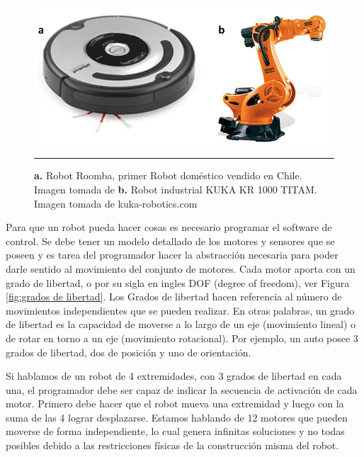 \begin{figure}[htbp]
	\centering
		\includegraphics[width=\textwidth]{./Figures/RobotsInd.png}
		\rule{35em}{0.5pt}
	\caption[Robots Roomba y KUKA]{\textbf{a. }Robot Roomba, primer Robot doméstico vendido en Chile. Imagen tomada de \cite{Forlizzi:2006:SRD:1121241.1121286} \textbf{b.} Robot industrial KUKA KR 1000 TITAM. Imagen tomada de kuka-robotics.com}
	\label{fig:Roomba y KUKA}
\end{figure}

Para que un robot pueda hacer cosas es necesario programar el software de control. Se debe tener un modelo detallado de los motores y sensores que se poseen y es tarea del programador hacer la abstracción necesaria para poder darle sentido al movimiento del conjunto de motores. Cada motor aporta con un grado de libertad, o por su sigla en ingles DOF (degree of freedom), ver Figura \ref{fig:grados de libertad}. Los Grados de libertad hacen referencia al número de movimientos independientes que se pueden realizar. En otras palabras, un grado de libertad es la capacidad de moverse a lo largo de un eje (movimiento lineal) o de rotar en torno a un eje (movimiento rotacional). Por ejemplo, un auto posee 3 grados de libertad, dos de posición y uno de orientación. 

Si hablamos de un robot de 4 extremidades, con 3 grados de libertad en cada una, el programador debe ser capaz de indicar la secuencia de activación de cada motor. Primero debe hacer que el robot mueva una extremidad y luego con la suma de las 4 lograr desplazarse. Estamos hablando de 12 motores que pueden moverse de forma independiente, lo cual genera infinitas soluciones y no todas posibles debido a las restricciones físicas de la construcción misma del robot.

